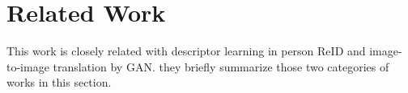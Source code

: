 \documentclass[10pt,twocolumn,letterpaper]{article}
\begin{document}
 \section{Related Work}
 This work is closely related with descriptor learning in
 person ReID and image-to-image translation by GAN. they
 briefly summarize those two categories of works in this section.
 
 
\end{document}
